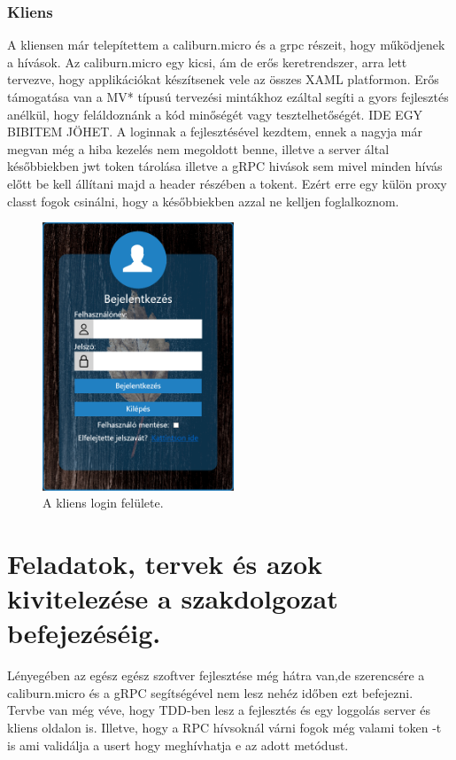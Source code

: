 \documentclass[conference]{IEEEtran}
\begin{document}
\subsubsection{Kliens}
A kliensen már telepítettem a caliburn.micro és a grpc részeit, hogy működjenek a hívások. Az caliburn.micro egy kicsi, ám de erős keretrendszer, arra lett tervezve, hogy applikációkat készítsenek vele az összes XAML platformon. Erős támogatása van a MV* típusú tervezési mintákhoz ezáltal segíti a gyors fejlesztés anélkül, hogy feláldoznánk a kód minőségét vagy tesztelhetőségét. IDE EGY BIBITEM JÖHET. A loginnak a fejlesztésével kezdtem, ennek a nagyja már megvan még a hiba kezelés nem megoldott benne, illetve a server által későbbiekben jwt token tárolása illetve a gRPC hivások sem mivel minden hívás előtt be kell állítani majd a header részében a tokent. Ezért erre egy külön proxy classt fogok csinálni, hogy a későbbiekben azzal ne kelljen foglalkoznom.
\begin{figure}[hp!]
	\centerline {\includegraphics[height=8cm,keepaspectratio]{login.png}}
	\caption{A kliens login felülete.}
	\label{fig2}
\end{figure}

\section*{Feladatok, tervek és azok kivitelezése a szakdolgozat befejezéséig.}
Lényegében az egész egész szoftver fejlesztése még hátra van,de szerencsére a caliburn.micro és a gRPC segítségével nem lesz nehéz időben ezt befejezni. Tervbe van még véve, hogy TDD-ben lesz a fejlesztés és egy loggolás server és kliens oldalon is. Illetve, hogy a RPC hívsoknál várni fogok még valami token -t is ami validálja a usert hogy meghívhatja e az adott metódust.
\end{document}
